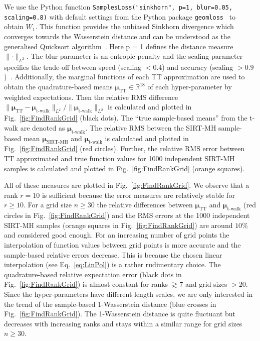 We use the Python function \texttt{SamplesLoss("sinkhorn", p=1, blur=0.05, scaling=0.8)} with default settings from the Python package \texttt{geomloss}~\cite{Wassersteinaccess} to obtain $W_1$.
This function provides the unbiased Sinkhorn divergence which converges towards the Wasserstein distance and can be understood as the generalised Quicksort algorithm~\cite{feydy2020OT}.
Here p = 1 defines the distance measure $\lVert \cdot \rVert_{L^2}$.
The blur parameter is an entropic penalty and the scaling parameter specifies the trade-off between speed (scaling $< 0.4$) and accuracy (scaling $>0.9$)~\cite{Wassersteinaccess}.
Additionally, the marginal functions of each TT approximation are used to obtain the quadrature-based means $\bm{\mu}_{\text{TT}} \in \mathbb{R}^{18}$ of each hyper-parameter by weighted expectations.
Then the relative RMS difference $\lVert\bm{\mu}_{\text{TT}} - \bm{\mu}_{\text{t-walk}} \rVert_{L^2} / \lVert \bm{\mu}_{\text{t-walk}} \rVert_{L^2} $ is calculated and plotted in Fig.~\ref{fig:FindRankGrid} (black dots).
The ``true sample-based means'' from the t-walk are denoted as $\bm{\mu}_{\text{t-walk}}$.
The relative RMS between the SIRT-MH sample-based mean $\bm{\mu}_{\text{SIRT-MH}}$ and $\bm{\mu}_{\text{t-walk}}$ is calculated and plotted in Fig.~\ref{fig:FindRankGrid} (red circles).
Further, the relative RMS error between TT approximated and true function values for 1000 independent SIRT-MH samples is calculated and plotted in Fig.~\ref{fig:FindRankGrid} (orange squares).

All of these measures are plotted in Fig.~\ref{fig:FindRankGrid}.
We observe that a rank $r = 10$ is sufficient because the error measures are relatively stable for $r\geq10$.
For a grid size $n \geq 30$ the relative differences between $\bm{\mu}_{\text{TT}}$ and $\bm{\mu}_{\text{t-walk}}$ (red circles in Fig.~\ref{fig:FindRankGrid}) and the RMS errors at the 1000 independent SIRT-MH samples (orange squares in Fig.~\ref{fig:FindRankGrid}) are around $ 10\%$ and considered good enough.
For an increasing number of grid points the interpolation of function values between grid points is more accurate and the sample-based relative errors decrease.
This is because the chosen linear interpolation (see Eq.~\ref{eq:LinPol}) is a rather rudimentary choice.
The quadrature-based relative expectation error (black dots in Fig.~\ref{fig:FindRankGrid}) is almost constant for ranks $ \gtrsim 7$ and grid sizes $ > 20$.
Since the hyper-parameters have different length scales, we are only interested in the trend of the sample-based 1-Wasserstein distance (blue crosses in Fig.~\ref{fig:FindRankGrid}).
The 1-Wasserstein distance is quite fluctuant but decreases with increasing ranks and stays within a similar range for grid sizes $n \geq 30$.


